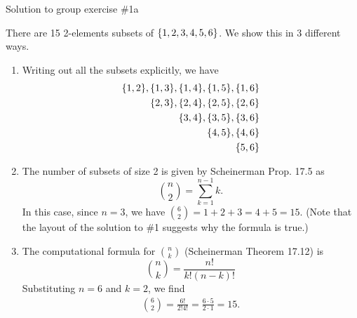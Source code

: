 \documentclass[10pt]{beamer}
\begin{document}
\begin{frame}{Solution to group exercise \#1a}
\footnotesize

 There are 15 2-elements subsets of $\{ {1,2,3,4,5,6} \}$.  We show this in 3 different ways. 
\begin{enumerate} 
	\item Writing out all the subsets explicitly, we have
%
\begin{align*}
\{ {1,2} \}, \{ {1,3} \}, \{ {1,4} \}, \{ {1,5} \}, \{ {1,6} \} \\
\{ {2,3} \}, \{ {2,4} \}, \{ {2,5} \}, \{ {2,6} \} \\
\{ {3,4} \}, \{ {3,5} \}, \{ {3,6} \} \\
\{ {4,5} \}, \{ {4,6} \} \\
\{ {5,6} \} 
\end{align*}
%
\item The number of subsets of size 2 is given by Scheinerman Prop. 17.5 as 
\[ \binom{n}{2} = \sum_{k=1}^{n-1} k. \]
In this case, since $n=3$, we have $ \binom{6}{2} = 1+2+3=4+5 = 15.$
(Note that the layout of the solution to \#1 suggests why the formula is true.) 
\item The computational formula for $\binom{n}{k}$ (Scheinerman Theorem 17.12) is 
\[ \binom{n}{k}  = \frac{n!}{k! (n-k)!}\] 
Substituting $n=6$ and $k=2$, we find
%
\begin{align*}
\binom{6}{2} = \frac{6!}{2!4!} = \frac{6 \cdot 5}{2 \cdot 1} = 15. 
\end{align*}
\end{enumerate}
\end{frame}
\end{document}
